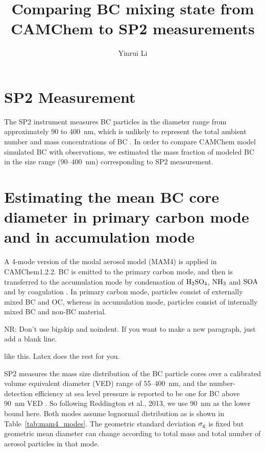 \documentclass[11pt]{article}
\title{\textbf{Comparing BC mixing state from CAMChem to SP2 measurements}}
\author{Yinrui Li}
\date{}
\newcommand{\nrtodo}[1]{{\color{blue} NR: #1}}
\begin{document}
\maketitle



\section{SP2 Measurement} 

The SP2 instrument measures BC particles in the diameter range from
approximately 90 to 400~nm, which is unlikely to represent the total
ambient number and mass concentrations of BC \citep{Reddington2013}.  In order to compare CAMChem model simulated BC with
observations, we estimated the mass fraction of modeled BC in the size
range (90--400~nm) corresponding to SP2 measurement.

\section{Estimating the mean BC core diameter in primary carbon mode and in accumulation mode} 

A 4-mode version of the modal aerosol model (MAM4) is applied in
CAMChem1.2.2. BC is emitted to the primary carbon mode, and then is
transferred to the accumulation mode by condensation of
$\rm{H_2SO_4}$, $\rm{NH_3}$ and $\rm{SOA}$ and by coagulation \citep{Liu2012}. In primary carbon mode, particles consist of externally
mixed BC and OC, whereas in accumulation mode, particles consist of
internally mixed BC and non-BC material.

\nrtodo{Don't use bigskip and noindent. If you want to make a new paragraph, just add a blank line.

  like this. Latex does the rest for you.}

\bigskip 
\noindent SP2 measures the mass size distribution of the BC particle
cores over a calibrated volume equivalent diameter (VED) range of
55--400~nm, and the number-detection efficiency at sea level pressure
is reported to be one for BC above 90~nm VED \citep{Schwarz2010a}. So following Reddington et al., 2013, we use 90~nm as the
lower bound here.
\bigskip
\noindent Both modes assume lognormal distribution as is shown in
Table~\ref{tab:mam4_modes}. The geometric standard deviation $\sigma_{\rm g}$ is fixed but geometric mean diameter can
change according to total mass and total number of aerosol particles
in that mode.
\end{document}
